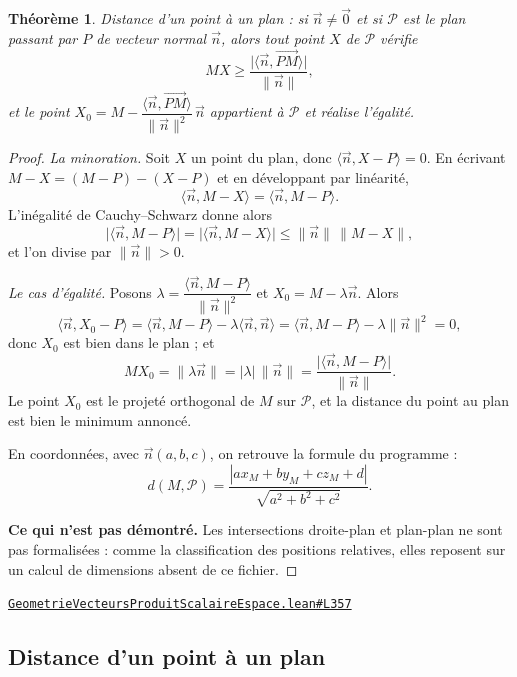 \documentclass[11pt,a4paper]{article}
\theoremstyle{definition}
\theoremstyle{plain}
\newtheorem{theoreme}{Théorème}
\newcommand{\source}[2]{\par\smallskip\noindent\hfill{\footnotesize\href{#1}{\texttt{#2}}}\par\smallskip}
\begin{document}
\begin{theoreme}
Distance d'un point à un plan : si $\vec n \ne \vec 0$ et si $\mathcal{P}$ est le plan
passant par $P$ de vecteur normal $\vec n$, alors tout point $X$ de $\mathcal{P}$ vérifie
\[ MX \ge \frac{\bigl|\langle \vec n, \overrightarrow{PM}\rangle\bigr|}{\|\vec n\|} , \]
et le point
$X_0 = M - \dfrac{\langle \vec n, \overrightarrow{PM}\rangle}{\|\vec n\|^{2}}\,\vec n$
appartient à $\mathcal{P}$ et réalise l'égalité.
\end{theoreme}

\begin{proof}
\emph{La minoration.} Soit $X$ un point du plan, donc
$\langle \vec n, X - P\rangle = 0$. En écrivant $M - X = (M - P) - (X - P)$ et en
développant par linéarité,
\[ \langle \vec n, M - X\rangle = \langle \vec n, M - P\rangle . \]
L'inégalité de Cauchy--Schwarz donne alors
\[ \bigl|\langle \vec n, M - P\rangle\bigr| = \bigl|\langle \vec n, M - X\rangle\bigr|
   \le \|\vec n\|\,\|M - X\| , \]
et l'on divise par $\|\vec n\| > 0$.

\emph{Le cas d'égalité.} Posons
$\lambda = \dfrac{\langle \vec n, M - P\rangle}{\|\vec n\|^{2}}$ et
$X_0 = M - \lambda \vec n$. Alors
\[ \langle \vec n, X_0 - P\rangle
   = \langle \vec n, M - P\rangle - \lambda \langle \vec n, \vec n\rangle
   = \langle \vec n, M - P\rangle - \lambda \|\vec n\|^{2} = 0 , \]
donc $X_0$ est bien dans le plan ; et
\[ MX_0 = \|\lambda \vec n\| = |\lambda|\,\|\vec n\|
   = \frac{\bigl|\langle \vec n, M - P\rangle\bigr|}{\|\vec n\|} . \]
Le point $X_0$ est le projeté orthogonal de $M$ sur $\mathcal{P}$, et la distance du point
au plan est bien le minimum annoncé.

\medskip\noindent
En coordonnées, avec $\vec n(a, b, c)$, on retrouve la formule du programme :
\[ d(M, \mathcal{P})
   = \frac{|a x_M + b y_M + c z_M + d|}{\sqrt{a^{2} + b^{2} + c^{2}}} . \]

\medskip\noindent
\textbf{Ce qui n'est pas démontré.} Les intersections droite-plan et plan-plan ne sont pas
formalisées : comme la classification des positions relatives, elles reposent sur un calcul
de dimensions absent de ce fichier.
\end{proof}
\source{https://github.com/Commutator-IO/learn-lean/blob/main/courses/02-lycee/08-geometrie-vecteurs-produit-scalaire-espace/GeometrieVecteursProduitScalaireEspace.lean\#L357}{GeometrieVecteursProduitScalaireEspace.lean\#L357}

\subsection{Distance d'un point à un plan}
\end{document}
